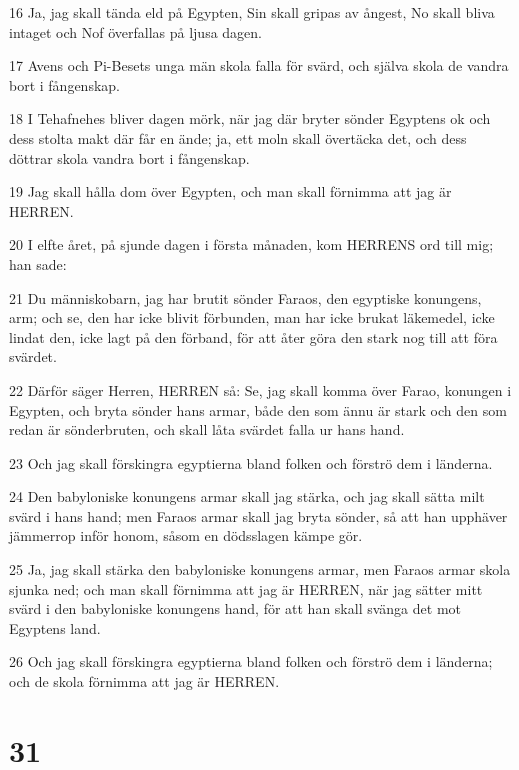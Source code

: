 \par 16 Ja, jag skall tända eld på Egypten, Sin skall gripas av ångest, No skall bliva intaget och Nof överfallas på ljusa dagen.
\par 17 Avens och Pi-Besets unga män skola falla för svärd, och själva skola de vandra bort i fångenskap.
\par 18 I Tehafnehes bliver dagen mörk, när jag där bryter sönder Egyptens ok och dess stolta makt där får en ände; ja, ett moln skall övertäcka det, och dess döttrar skola vandra bort i fångenskap.
\par 19 Jag skall hålla dom över Egypten, och man skall förnimma att jag är HERREN.
\par 20 I elfte året, på sjunde dagen i första månaden, kom HERRENS ord till mig; han sade:
\par 21 Du människobarn, jag har brutit sönder Faraos, den egyptiske konungens, arm; och se, den har icke blivit förbunden, man har icke brukat läkemedel, icke lindat den, icke lagt på den förband, för att åter göra den stark nog till att föra svärdet.
\par 22 Därför säger Herren, HERREN så: Se, jag skall komma över Farao, konungen i Egypten, och bryta sönder hans armar, både den som ännu är stark och den som redan är sönderbruten, och skall låta svärdet falla ur hans hand.
\par 23 Och jag skall förskingra egyptierna bland folken och förströ dem i länderna.
\par 24 Den babyloniske konungens armar skall jag stärka, och jag skall sätta milt svärd i hans hand; men Faraos armar skall jag bryta sönder, så att han upphäver jämmerrop inför honom, såsom en dödsslagen kämpe gör.
\par 25 Ja, jag skall stärka den babyloniske konungens armar, men Faraos armar skola sjunka ned; och man skall förnimma att jag är HERREN, när jag sätter mitt svärd i den babyloniske konungens hand, för att han skall svänga det mot Egyptens land.
\par 26 Och jag skall förskingra egyptierna bland folken och förströ dem i länderna; och de skola förnimma att jag är HERREN.

\chapter{31}

